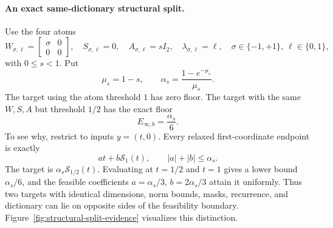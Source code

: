 \documentclass[twoside,11pt]{article}
\newcommand{\soft}{\mathcal{S}}
\newcommand{\abs}[1]{\left\lvert #1\right\rvert}
\begin{document}
\paragraph{An exact same-dictionary structural split.}
Use the four atoms
\begin{equation}
 W_{\sigma,\ell}=
 \begin{bmatrix}\sigma&0\\0&0\end{bmatrix},
 \quad S_{\sigma,\ell}=0,
 \quad A_{\sigma,\ell}=sI_2,
 \quad \lambda_{\sigma,\ell}=\ell,
 \quad \sigma\in\{-1,+1\},\ \ell\in\{0,1\},
 \label{eq:structural-split-atoms-main}
\end{equation}
with $0\le s<1$.  Put
\begin{equation}
 \mu_s=1-s,
 \qquad
 \alpha_s=\frac{1-e^{-\mu_s}}{\mu_s}.
 \label{eq:alpha-s-main}
\end{equation}
The target using the atom threshold $1$ has zero floor.  The target with the same $W,S,A$ but threshold $1/2$ has the exact floor
\begin{equation}
 E_{\infty,b}=\frac{\alpha_s}{6}.
 \label{eq:exact-positive-floor-main}
\end{equation}
To see why, restrict to inputs $y=(t,0)$.  Every relaxed first-coordinate endpoint is exactly
\begin{equation}
 at+b\soft_1(t),
 \qquad \abs a+\abs b\le\alpha_s.
 \label{eq:split-relaxed-class-main}
\end{equation}
The target is $\alpha_s\soft_{1/2}(t)$.  Evaluating at $t=1/2$ and $t=1$ gives a lower bound $\alpha_s/6$, and the feasible coefficients $a=\alpha_s/3$, $b=2\alpha_s/3$ attain it uniformly.  Thus two targets with identical dimensions, norm bounds, masks, recurrence, and dictionary can lie on opposite sides of the feasibility boundary.  Figure~\ref{fig:structural-split-evidence} visualizes this distinction.
\end{document}
